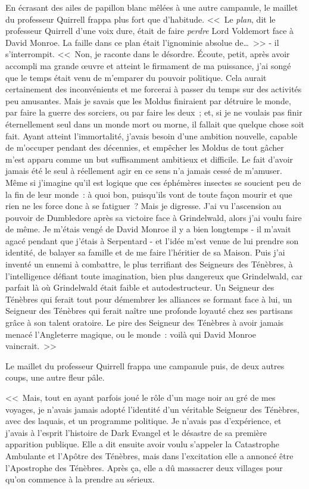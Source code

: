 En écrasant des ailes de papillon blanc mêlées à une autre campanule, le maillet du professeur Quirrell frappa plus fort que d'habitude. <<~Le \emph{plan}, dit le professeur Quirrell d'une voix dure, était de faire \emph{perdre} Lord Voldemort face à David Monroe. La faille dans ce plan était l'ignominie absolue de…~>> - il s'interrompit. <<~Non, je raconte dans le désordre. Écoute, petit, après avoir accompli ma grande œuvre et atteint le firmament de ma puissance, j'ai songé que le temps était venu de m'emparer du pouvoir politique. Cela aurait certainement des inconvénients et me forcerai à passer du temps sur des activités peu amusantes. Mais je savais que les Moldus finiraient par détruire le monde, par faire la guerre des sorciers, ou par faire les deux~; et, si je ne voulais pas finir éternellement seul dans un monde mort ou morne, il fallait que quelque chose soit fait. Ayant atteint l'immortalité, j'avais besoin d'une ambition nouvelle, capable de m'occuper pendant des décennies, et empêcher les Moldus de tout gâcher m'est apparu comme un but suffisamment ambitieux et difficile. Le fait d'avoir jamais été le seul à réellement agir en ce sens n'a jamais cessé de m'amuser. Même si j'imagine qu'il est logique que ces éphémères insectes se soucient peu de la fin de leur monde~: à quoi bon, puisqu'ils vont de toute façon mourir et que rien ne les force donc à se fatiguer~? Mais je digresse. J'ai vu l'ascension au pouvoir de Dumbledore après sa victoire face à Grindelwald, alors j'ai voulu faire de même. Je m'étais vengé de David Monroe il y a bien longtemps - il m'avait agacé pendant que j'étais à Serpentard - et l'idée m'est venue de lui prendre son identité, de balayer sa famille et de me faire l'héritier de sa Maison. Puis j'ai inventé un ennemi à combattre, le plus terrifiant des Seigneurs des Ténèbres, à l'intelligence défiant toute imagination, bien plus dangereux que Grindelwald, car parfait là où Grindelwald était faible et autodestructeur. Un Seigneur des Ténèbres qui ferait tout pour démembrer les alliances se formant face à lui, un Seigneur des Ténèbres qui ferait naître une profonde loyauté chez ses partisans grâce à son talent oratoire. Le pire des Seigneur des Ténèbres à avoir jamais menacé l'Angleterre magique, ou le monde~: voilà qui David Monroe vaincrait.~>>

Le maillet du professeur Quirrell frappa une campanule puis, de deux autres coups, une autre fleur pâle.

<<~Mais, tout en ayant parfois joué le rôle d'un mage noir au gré de mes voyages, je n'avais jamais adopté l'identité d'un véritable Seigneur des Ténèbres, avec des laquais, et un programme politique. Je n'avais pas d'expérience, et j'avais à l'esprit l'histoire de Dark Evangel et le désastre de sa première apparition publique. Elle a dit ensuite avoir voulu s'appeler la Catastrophe Ambulante et l'Apôtre des Ténèbres, mais dans l'excitation elle a annoncé être l'Apostrophe des Ténèbres. Après ça, elle a dû massacrer deux villages pour qu'on commence à la prendre au sérieux.


